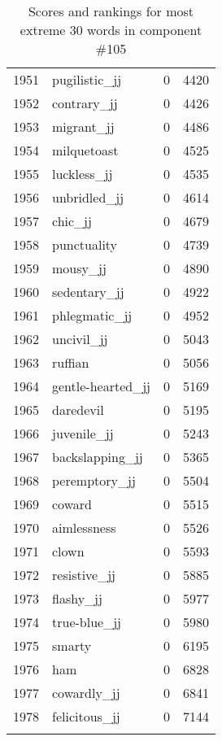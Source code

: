 \begin{longtable}[!htbp]{| rlr@{.}l |}
    1951 & pugilistic\_jj & 0 & 4420 \\
    1952 & contrary\_jj & 0 & 4426 \\
    1953 & migrant\_jj & 0 & 4486 \\
    1954 & milquetoast & 0 & 4525 \\
    1955 & luckless\_jj & 0 & 4535 \\
    1956 & unbridled\_jj & 0 & 4614 \\
    1957 & chic\_jj & 0 & 4679 \\
    1958 & punctuality & 0 & 4739 \\
    1959 & mousy\_jj & 0 & 4890 \\
    1960 & sedentary\_jj & 0 & 4922 \\
    1961 & phlegmatic\_jj & 0 & 4952 \\
    1962 & uncivil\_jj & 0 & 5043 \\
    1963 & ruffian & 0 & 5056 \\
    1964 & gentle-hearted\_jj & 0 & 5169 \\
    1965 & daredevil & 0 & 5195 \\
    1966 & juvenile\_jj & 0 & 5243 \\
    1967 & backslapping\_jj & 0 & 5365 \\
    1968 & peremptory\_jj & 0 & 5504 \\
    1969 & coward & 0 & 5515 \\
    1970 & aimlessness & 0 & 5526 \\
    1971 & clown & 0 & 5593 \\
    1972 & resistive\_jj & 0 & 5885 \\
    1973 & flashy\_jj & 0 & 5977 \\
    1974 & true-blue\_jj & 0 & 5980 \\
    1975 & smarty & 0 & 6195 \\
    1976 & ham & 0 & 6828 \\
    1977 & cowardly\_jj & 0 & 6841 \\
    1978 & felicitous\_jj & 0 & 7144 \\
    \hline
    \caption{Scores and rankings for most extreme 30 words in component \#105} \\
\end{longtable}
